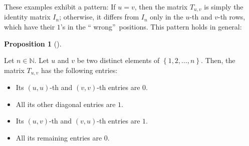 \documentclass[numbers=enddot,12pt,final,onecolumn,notitlepage]{scrartcl}%
\theoremstyle{definition}
\newtheorem{prop}[theo]{Proposition}
\newenvironment{proposition}[1][]
{\begin{prop}[#1]\begin{leftbar}}
{\end{leftbar}\end{prop}}
\begin{document}
These examples exhibit a pattern: If $u=v$, then the matrix $T_{u,v}$ is
simply the identity matrix $I_{n}$; otherwise, it differs from $I_{n}$ only in
the $u$-th and $v$-th rows, which have their $1$'s in the \textquotedblleft
wrong\textquotedblright\ positions. This pattern holds in general:

\begin{proposition}
\label{prop.Tuv.entries}Let $n\in\mathbb{N}$. Let $u$ and $v$ be two distinct
elements of $\left\{  1,2,\ldots,n\right\}  $. Then, the matrix $T_{u,v}$ has
the following entries:

\begin{itemize}
\item Its $\left(  u,u\right)  $-th and $\left(  v,v\right)  $-th entries are
$0$.

\item All its other diagonal entries are $1$.

\item Its $\left(  u,v\right)  $-th and $\left(  v,u\right)  $-th entries are
$1$.

\item All its remaining entries are $0$.
\end{itemize}
\end{proposition}
\end{document}
